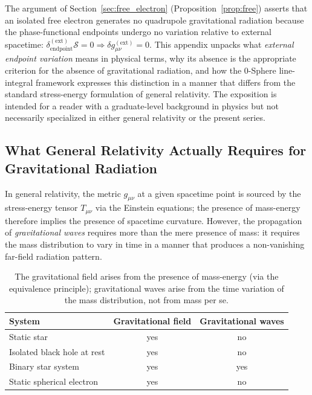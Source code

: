\documentclass[%
 reprint, amsmath,amssymb, aps, prd, ]{revtex4-2}
\numberwithin{equation}{section}
\begin{document}
The argument of Section~\ref{sec:free_electron} (Proposition~\ref{prop:free}) asserts that an isolated free electron generates no quadrupole gravitational radiation because the phase-functional endpoints undergo no variation relative to external spacetime: $\delta_{\mathrm{endpoint}}^{(\mathrm{ext})}\mathcal{S} = 0 \Rightarrow \delta g_{\mu\nu}^{(\mathrm{ext})} = 0$.
This appendix unpacks what \emph{external endpoint variation} means in physical terms, why its absence is the appropriate criterion for the absence of gravitational radiation, and how the 0-Sphere line-integral framework expresses this distinction in a manner that differs from the standard stress-energy formulation of general relativity.
The exposition is intended for a reader with a graduate-level background in physics but not necessarily specialized in either general relativity or the present series.

\subsection{What General Relativity Actually Requires for Gravitational Radiation}

In general relativity, the metric $g_{\mu\nu}$ at a given spacetime point is sourced by the stress-energy tensor $T_{\mu\nu}$ via the Einstein equations; the presence of mass-energy therefore implies the presence of spacetime curvature.
However, the propagation of \emph{gravitational waves} requires more than the mere presence of mass: it requires the mass distribution to vary in time in a manner that produces a non-vanishing far-field radiation pattern.

\begin{table}[t!]
\centering
\renewcommand{\arraystretch}{1.35}
\begin{tabular}{lcc}
\hline\hline
System & Gravitational field & Gravitational waves \\
\hline
Static star                  & yes & no  \\
Isolated black hole at rest  & yes & no  \\
Binary star system           & yes & yes \\
Static spherical electron    & yes & no  \\
\hline\hline
\end{tabular}
\caption{The gravitational field arises from the presence of mass-energy (via the equivalence principle); gravitational waves arise from the time variation of the mass distribution, not from mass per se.}
\label{tab:GR_field_vs_waves}
\end{table}
\end{document}

